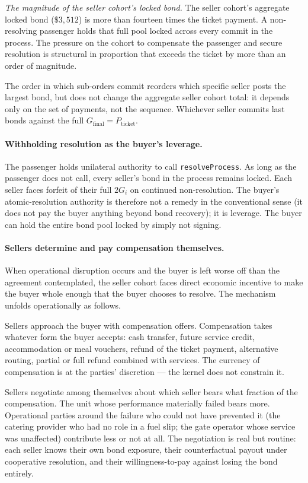 \documentclass[11pt,a4paper]{article}
\theoremstyle{definition}
\theoremstyle{remark}
\begin{document}
\emph{The magnitude of the seller cohort's locked bond.} The
seller cohort's aggregate locked bond ($\$3{,}512$) is more than
fourteen times the ticket payment. A non-resolving passenger
holds that full pool locked across every commit in the process.
The pressure on the cohort to compensate the passenger and secure
resolution is structural in proportion that exceeds the ticket by
more than an order of magnitude.

The order in which sub-orders commit reorders which specific
seller posts the largest bond, but does not change the aggregate
seller cohort total: it depends only on the set of payments, not
the sequence. Whichever seller commits last bonds against the
full $G_{\text{final}} = P_{\text{ticket}}$.

\paragraph{Withholding resolution as the buyer's leverage.}
The passenger holds unilateral authority to call
\texttt{resolveProcess}. As long as the passenger does not call,
every seller's bond in the process remains locked. Each seller
faces forfeit of their full $2G_i$ on continued non-resolution.
The buyer's atomic-resolution authority is therefore not a remedy
in the conventional sense (it does not pay the buyer anything
beyond bond recovery); it is leverage. The buyer can hold the
entire bond pool locked by simply not signing.

\paragraph{Sellers determine and pay compensation themselves.}
When operational disruption occurs and the buyer is left worse
off than the agreement contemplated, the seller cohort faces
direct economic incentive to make the buyer whole enough that the
buyer chooses to resolve. The mechanism unfolds operationally as
follows.

Sellers approach the buyer with compensation offers. Compensation
takes whatever form the buyer accepts: cash transfer, future
service credit, accommodation or meal vouchers, refund of the
ticket payment, alternative routing, partial or full refund
combined with services. The currency of compensation is at the
parties' discretion --- the kernel does not constrain it.

Sellers negotiate among themselves about which seller bears what
fraction of the compensation. The unit whose performance
materially failed bears more. Operational parties around the
failure who could not have prevented it (the catering provider
who had no role in a fuel slip; the gate operator whose service
was unaffected) contribute less or not at all. The negotiation is
real but routine: each seller knows their own bond exposure,
their counterfactual payout under cooperative resolution, and
their willingness-to-pay against losing the bond entirely.
\end{document}
